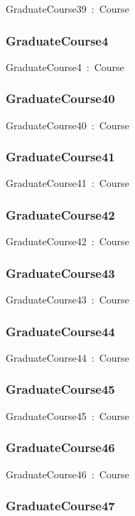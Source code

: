 \documentclass{article}
\begin{document}
GraduateCourse39~:~Course

\subsubsection*{GraduateCourse4}

GraduateCourse4~:~Course

\subsubsection*{GraduateCourse40}

GraduateCourse40~:~Course

\subsubsection*{GraduateCourse41}

GraduateCourse41~:~Course

\subsubsection*{GraduateCourse42}

GraduateCourse42~:~Course

\subsubsection*{GraduateCourse43}

GraduateCourse43~:~Course

\subsubsection*{GraduateCourse44}

GraduateCourse44~:~Course

\subsubsection*{GraduateCourse45}

GraduateCourse45~:~Course

\subsubsection*{GraduateCourse46}

GraduateCourse46~:~Course

\subsubsection*{GraduateCourse47}
\end{document}
